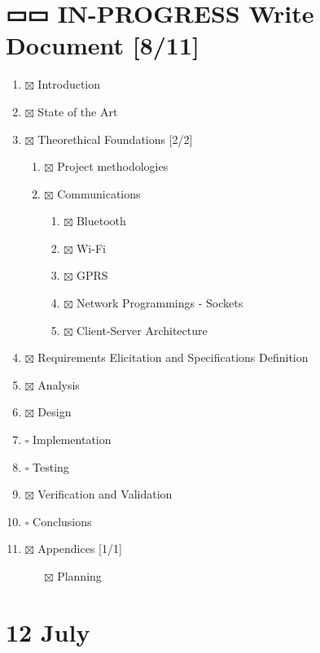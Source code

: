 \documentclass[11pt]{article}
\begin{document}
\section{{\bfseries\sffamily ▭▭ IN-PROGRESS} Write Document [8/11]}
\label{sec:org138e41c}
\begin{enumerate}
\item{$\boxtimes$} Introduction
\item{$\boxtimes$} State of the Art
\item{$\boxtimes$} Theorethical Foundations [2/2]
\begin{enumerate}
\item{$\boxtimes$} Project methodologies
\item{$\boxtimes$} Communications
\begin{enumerate}
\item{$\boxtimes$} Bluetooth
\item{$\boxtimes$} Wi-Fi
\item{$\boxtimes$} GPRS
\item{$\boxtimes$} Network Programmings - Sockets
\item{$\boxtimes$} Client-Server Architecture
\end{enumerate}
\end{enumerate}
\item{$\boxtimes$} Requirements Elicitation and Specifications Definition
\item{$\boxtimes$} Analysis
\item{$\boxtimes$} Design
\item{$\square$} Implementation
\item{$\square$} Testing
\item{$\boxtimes$} Verification and Validation
\item{$\square$} Conclusions
\item{$\boxtimes$} Appendices [1/1]
\begin{itemize}
\item[{$\boxtimes$}] Planning
\end{itemize}
\end{enumerate}

\section{12 July}
\label{sec:orgf96db10}
\end{document}
